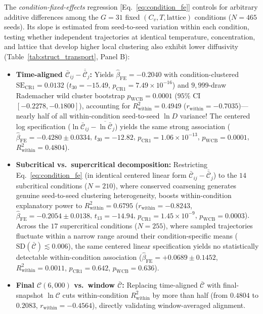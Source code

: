 \documentclass[aps,pre,reprint,superscriptaddress,amsmath,amssymb,floatfix]{revtex4-2}
\begin{document}
The \emph{condition-fixed-effects} \mbox{regression} [Eq.~\eqref{eq:condition_fe}] controls for arbitrary additive differences among the $G=31$ fixed $(C_v,T,\text{lattice})$ conditions ($N=465$ seeds). Its slope is estimated from seed-to-seed variation within each condition, testing whether independent trajectories at identical temperature, concentration, and lattice that develop higher local clustering also exhibit lower diffusivity (Table~\ref{tab:struct_transport}, Panel B):
\begin{itemize}
  \item \textbf{Time-aligned $\bar{\mathcal{C}}_{ij} - \overline{\bar{\mathcal{C}}}_j$:} Yields $\hat{\beta}_{\mathrm{FE}} = -0.2040$ with condition-clustered $\mathrm{SE}_{\mathrm{CR1}} = 0.0132$ ($t_{30} = -15.49$, $p_{\mathrm{CR1}} = 7.49 \times 10^{-16}$) and $9{,}999$-draw Rademacher wild cluster bootstrap $p_{\mathrm{WCB}} = 0.0001$ ($95\%$ CI $[-0.2278, -0.1800]$), accounting for $R^2_{\mathrm{within}} = 0.4949$ ($r_{\mathrm{within}} = -0.7035$)---nearly half of all within-condition seed-to-seed $\ln D$ variance! The centered log specification ($\ln\bar{\mathcal{C}}_{ij} - \overline{\ln\bar{\mathcal{C}}}_j$) yields the same strong association ($\hat{\beta}_{\mathrm{FE}} = -0.4280 \pm 0.0334$, $t_{30} = -12.82$, $p_{\mathrm{CR1}} = 1.06 \times 10^{-13}$, $p_{\mathrm{WCB}} = 0.0001$, $R^2_{\mathrm{within}} = 0.4804$).
  \item \textbf{Subcritical vs.\ supercritical decomposition:} Restricting Eq.~\eqref{eq:condition_fe} (in identical centered linear form $\bar{\mathcal{C}}_{ij} - \overline{\bar{\mathcal{C}}}_j$) to the $14$ subcritical conditions ($N = 210$), where conserved coarsening generates genuine seed-to-seed clustering heterogeneity, boosts within-condition explanatory power to $R^2_{\mathrm{within}} = 0.6795$ ($r_{\mathrm{within}} = -0.8243$, $\hat{\beta}_{\mathrm{FE}} = -0.2054 \pm 0.0138$, $t_{13} = -14.94$, $p_{\mathrm{CR1}} = 1.45 \times 10^{-9}$, $p_{\mathrm{WCB}} = 0.0003$). Across the $17$ supercritical conditions ($N=255$), where sampled trajectories fluctuate within a narrow range around their condition-specific means ($\mathrm{SD}(\bar{\mathcal{C}}) \lesssim 0.006$), the same centered linear specification yields no statistically detectable within-condition association ($\hat{\beta}_{\mathrm{FE}} = +0.0689 \pm 0.1452$, $R^2_{\mathrm{within}} = 0.0011$, $p_{\mathrm{CR1}} = 0.642$, $p_{\mathrm{WCB}} = 0.636$).
  \item \textbf{Final $\mathcal{C}(6{,}000)$ vs.\ window $\bar{\mathcal{C}}$:} Replacing time-aligned $\bar{\mathcal{C}}$ with final-snapshot $\ln\mathcal{C}$ cuts within-condition $R^2_{\mathrm{within}}$ by more than half (from $0.4804$ to $0.2083$, $r_{\mathrm{within}} = -0.4564$), directly validating window-averaged alignment.

\end{itemize}
\end{document}
